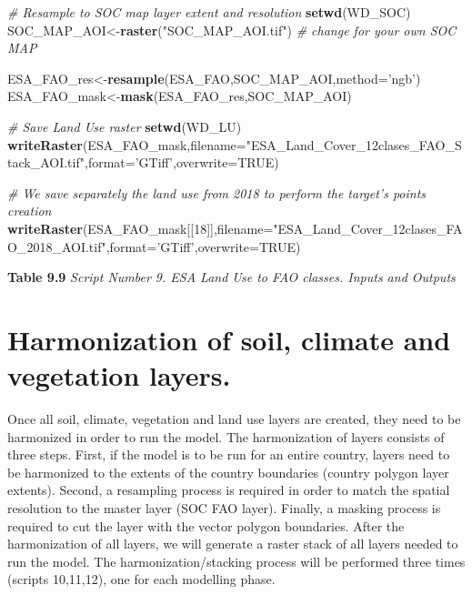 \documentclass[
  10pt,
  b5paper,
]{book}
\newenvironment{Shaded}{\begin{snugshade}}{\end{snugshade}}
\newcommand{\CommentTok}[1]{\textcolor[rgb]{0.56,0.35,0.01}{\textit{#1}}}
\newcommand{\DataTypeTok}[1]{\textcolor[rgb]{0.13,0.29,0.53}{#1}}
\newcommand{\DecValTok}[1]{\textcolor[rgb]{0.00,0.00,0.81}{#1}}
\newcommand{\KeywordTok}[1]{\textcolor[rgb]{0.13,0.29,0.53}{\textbf{#1}}}
\newcommand{\NormalTok}[1]{#1}
\newcommand{\OtherTok}[1]{\textcolor[rgb]{0.56,0.35,0.01}{#1}}
\newcommand{\StringTok}[1]{\textcolor[rgb]{0.31,0.60,0.02}{#1}}
\begin{document}
\begin{Shaded}
\begin{Highlighting}[]
\CommentTok{# Resample to SOC map layer extent and resolution}
\KeywordTok{setwd}\NormalTok{(WD_SOC)}
\NormalTok{SOC_MAP_AOI<-}\KeywordTok{raster}\NormalTok{(}\StringTok{"SOC_MAP_AOI.tif"}\NormalTok{) }\CommentTok{# change for your own SOC MAP}

\NormalTok{ESA_FAO_res<-}\KeywordTok{resample}\NormalTok{(ESA_FAO,SOC_MAP_AOI,}\DataTypeTok{method=}\StringTok{'ngb'}\NormalTok{) }
\NormalTok{ESA_FAO_mask<-}\KeywordTok{mask}\NormalTok{(ESA_FAO_res,SOC_MAP_AOI) }

\CommentTok{# Save Land Use raster}
\KeywordTok{setwd}\NormalTok{(WD_LU)}
\KeywordTok{writeRaster}\NormalTok{(ESA_FAO_mask,}\DataTypeTok{filename=}\StringTok{"ESA_Land_Cover_12clases_FAO_Stack_AOI.tif"}\NormalTok{,}\DataTypeTok{format=}\StringTok{'GTiff'}\NormalTok{,}\DataTypeTok{overwrite=}\OtherTok{TRUE}\NormalTok{)}

\CommentTok{# We save separately the land use from 2018 to perform the target's points creation}
\KeywordTok{writeRaster}\NormalTok{(ESA_FAO_mask[[}\DecValTok{18}\NormalTok{]],}\DataTypeTok{filename=}\StringTok{"ESA_Land_Cover_12clases_FAO_2018_AOI.tif"}\NormalTok{,}\DataTypeTok{format=}\StringTok{'GTiff'}\NormalTok{,}\DataTypeTok{overwrite=}\OtherTok{TRUE}\NormalTok{)}
\end{Highlighting}
\end{Shaded}

\textbf{Table 9.9} \emph{Script Number 9. ESA Land Use to FAO classes. Inputs and Outputs}

\hypertarget{harmonization-of-soil-climate-and-vegetation-layers.}{%
\section{Harmonization of soil, climate and vegetation layers.}\label{harmonization-of-soil-climate-and-vegetation-layers.}}

Once all soil, climate, vegetation and land use layers are created, they need to be harmonized in order to run the model. The harmonization of layers consists of three steps. First, if the model is to be run for an entire country, layers need to be harmonized to the extents of the country boundaries (country polygon layer extents). Second, a resampling process is required in order to match the spatial resolution to the master layer (SOC FAO layer). Finally, a masking process is required to cut the layer with the vector polygon boundaries. After the harmonization of all layers, we will generate a raster stack of all layers needed to run the model. The harmonization/stacking process will be performed three times (scripts 10,11,12), one for each modelling phase.
\end{document}
